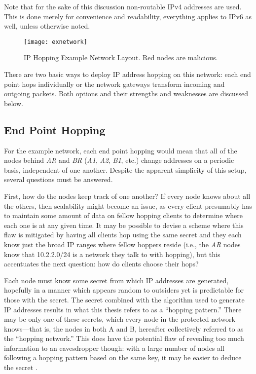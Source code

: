 \par Note that for the sake of this discussion non-routable \ac{IPv4} addresses are used. This is done merely for convenience and readability, everything applies to \ac{IPv6} as well, unless otherwise noted.

\begin{figure}
	\centering
	\texttt{[image: exnetwork]}
	\caption[\ac{IP} Hopping Example Network]{\ac{IP} Hopping Example Network Layout. Red nodes are malicious.}
	\label{fig:exnetwork}
\end{figure}

\par There are two basic ways to deploy IP address hopping on this network: each end point hops individually or the network gateways transform incoming and outgoing packets. Both options and their strengths and weaknesses are discussed below.

\subsection{End Point Hopping}
\par For the example network, each end point hopping would mean that all of the nodes behind \textit{AR} and \textit{BR} (\textit{A1}, \textit{A2}, \textit{B1}, etc.) change addresses on a periodic basis, independent of one another. Despite the apparent simplicity of this setup, several questions must be answered.

\par First, how do the nodes keep track of one another? If every node knows about all the others, then scalability might become an issue, as every client presumably has to maintain some amount of data on fellow hopping clients to determine where each one is at any given time. It may be possible to devise a scheme where this flaw is mitigated by having all clients hop using the same secret and they each know just the broad IP ranges where fellow hoppers reside (i.e., the \textit{AR} nodes know that 10.2.2.0/24 is a network they talk to with hopping), but this accentuates the next question: how do clients choose their hops?

\par Each node must know some secret from which \ac{IP} addresses are generated, hopefully in a manner which appears random to outsiders yet is predictable for those with the secret. The secret combined with the algorithm used to generate \ac{IP} addresses results in what this thesis refers to as a ``hopping pattern.'' There may be only one of these secrets, which every node in the protected network knows---that is, the nodes in both A and B, hereafter collectively referred to as the ``hopping network.'' This does have the potential flaw of revealing too much information to an eavesdropper though: with a large number of nodes all following a hopping pattern based on the same key, it may be easier to deduce the secret \cite{ShannonEntropy}.

